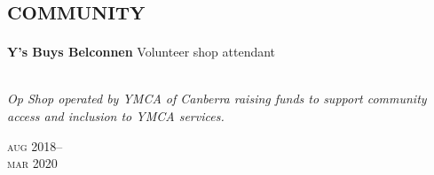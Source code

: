 
\section*{\textsc{community}}
\vspace{-0.2cm}


\begin{minipage}[t]{\mainboxwidth\textwidth}
\textbf{Y's Buys Belconnen}\phantom{..} Volunteer shop attendant\\
\\
{\small
\textit{Op Shop operated by YMCA of Canberra raising funds to support community access and inclusion to YMCA services.}
\par}
\end{minipage}
\begin{minipage}[t]{\detailboxwidth\textwidth}
{
\hfill \textsc{aug} 2018--\\ 
\hspace*{0pt} \hfill \textsc{mar} 2020
\par
}
\end{minipage}
\\

